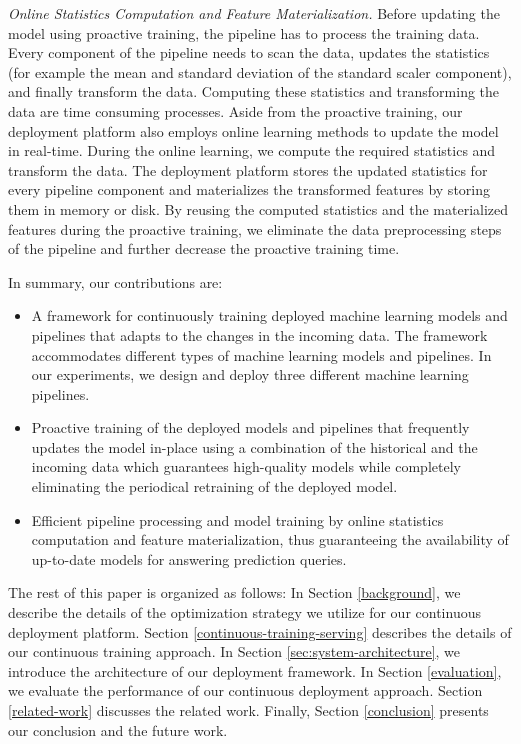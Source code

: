 \textit{Online Statistics Computation and Feature Materialization.}
Before updating the model using proactive training, the pipeline has to process the training data.
Every component of the pipeline needs to scan the data, updates the statistics (for example the mean and standard deviation of the standard scaler component), and finally transform the data.
Computing these statistics and transforming the data are time consuming processes.
Aside from the proactive training, our deployment platform also employs online learning methods to update the model in real-time.
During the online learning, we compute the required statistics and transform the data.
The deployment platform stores the updated statistics for every pipeline component and materializes the transformed features by storing them in memory or disk.
By reusing the computed statistics and the materialized features during the proactive training, we eliminate the data preprocessing steps of the pipeline and further decrease the proactive training time.

In summary, our contributions are:
\begin{itemize}
\item A framework for continuously training deployed machine learning models and pipelines that adapts to the changes in the incoming data. The framework accommodates different types of machine learning models and pipelines. In our experiments, we design and deploy three different machine learning pipelines.
\item Proactive training of the deployed models and pipelines that frequently updates the model in-place using a combination of the historical and the incoming data which guarantees high-quality models while completely eliminating the periodical retraining of the deployed model.
\item Efficient pipeline processing and model training by online statistics computation and feature materialization, thus guaranteeing the availability of up-to-date models for answering prediction queries.
\end{itemize}

The rest of this paper is organized as follows:
In Section \ref{background}, we describe the details of the optimization strategy we utilize for our continuous deployment platform.
Section \ref{continuous-training-serving} describes the details of our continuous training approach.
In Section \ref{sec:system-architecture}, we introduce the architecture of our deployment framework.
In Section \ref{evaluation}, we evaluate the performance of our continuous deployment approach.
Section \ref {related-work} discusses the related work.
Finally, Section \ref{conclusion} presents our conclusion and the future work.